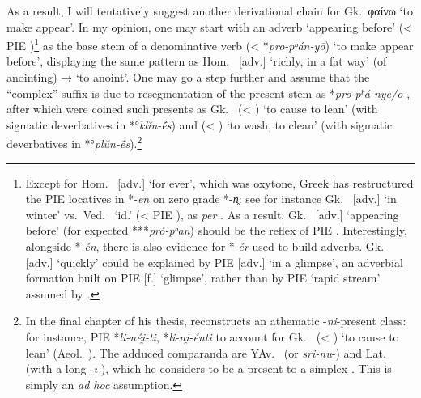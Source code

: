 \documentclass[output=paper,colorlinks,citecolor=brown]{langscibook}
\begin{document}
As a result, I will tentatively suggest another derivational chain for Gk.\ φαίνω ‘to make appear’. In my opinion, one may start with an adverb  ‘appearing before’ (< PIE )\footnote{Except for Hom.\  [adv.] ‘for ever’, which was oxytone, Greek has restructured the PIE locatives in *-\textit{en}  on zero grade *-{\textit{n̥}}: see for instance Gk.\  [adv.] ‘in winter’ vs.\ Ved.\  ‘id.’ (< PIE ), as \textit{per} \citet[189]{Nussbaum1986}. As a result, Gk.\  [adv.] ‘appearing before’ (for expected ***\textit{pró-pʰan}) should be the reflex of PIE . Interestingly, alongside  *-\textit{én}, there is also evidence for  *-\textit{ér} used to build adverbs. Gk.\  [adv.] ‘quickly’ could be explained by PIE  [adv.] ‘in a glimpse’, an adverbial formation built on PIE  [f.] ‘glimpse’, rather than by PIE  ‘rapid stream’ assumed by \citet[327]{Willi2004}.} as the base stem of a denominative verb  (< *\textit{pro-pʰán-yō}) ‘to make appear before’, displaying the same pattern as Hom.\  [adv.] ‘richly, in a fat way’ (of anointing) →  ‘to anoint’. One may go a step further and assume that the “complex” suffix   is due to resegmentation of the present stem   as *\textit{pro-pʰá-nye/o-}, after which were coined such presents as Gk.\  (< )  ‘to cause to lean’ (with sigmatic deverbatives in *°\textit{klĭn-ḗs}) and  (< ) ‘to wash, to clean’ (with sigmatic deverbatives in *°\textit{plŭn-ḗs}).\footnote{In the final chapter of his thesis, \citet[121--135]{Praust1998} reconstructs an athematic -\textit{ni}-present class: for instance, PIE *\textit{\kinvbreve li-néi̯-ti}, *\textit{\kinvbreve li-ni̯-énti}  to account for Gk.\  (< ) ‘to cause to lean’ (Aeol.\ ). The adduced comparanda are YAv.\  (or \textit{sri-nu}-) and Lat.\  (with a long -\textit{ī}-), which he considers to be a  present to a simplex  \citep[132]{Praust1998}. This is simply an \textit{ad hoc} assumption.}
\end{document}
